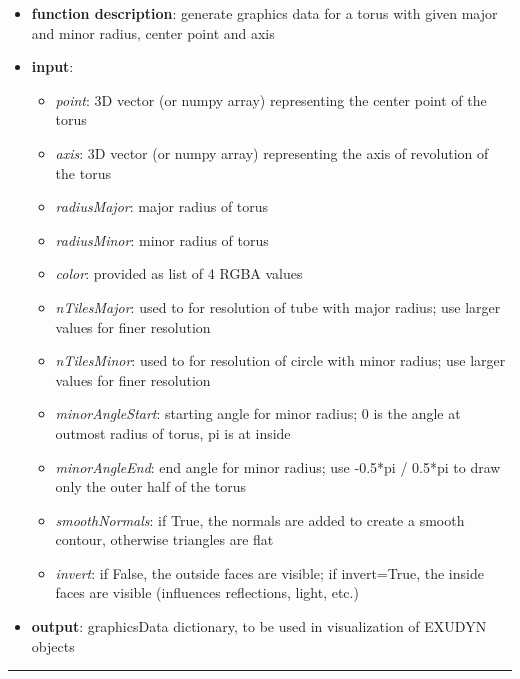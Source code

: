 \begin{itemize}[leftmargin=1.4cm]
\begin{itemize}[leftmargin=1.4cm]
\begin{itemize}[leftmargin=1.4cm]
\begin{itemize}[leftmargin=0.5cm]
\begin{itemize}[leftmargin=1.4cm]
\begin{itemize}[leftmargin=1.4cm]
\begin{itemize}[leftmargin=1.4cm]
\begin{itemize}[leftmargin=0.5cm]
\begin{itemize}[leftmargin=1.4cm]
\begin{itemize}[leftmargin=0.7cm]
\item[--]
{\bf function description}: generate graphics data for a torus with given major and minor radius, center point and axis
\item[--]
{\bf input}: \vspace{-6pt}
\begin{itemize}[leftmargin=1.2cm]
\setlength{\itemindent}{-0.7cm}
\item[]{\it point}: 3D vector (or numpy array) representing the center point of the torus
\item[]{\it axis}: 3D vector (or numpy array) representing the axis of revolution of the torus
\item[]{\it radiusMajor}: major radius of torus
\item[]{\it radiusMinor}: minor radius of torus
\item[]{\it color}: provided as list of 4 RGBA values
\item[]{\it nTilesMajor}: used to for resolution of tube with major radius; use larger values for finer resolution
\item[]{\it nTilesMinor}: used to for resolution of circle with minor radius; use larger values for finer resolution
\item[]{\it minorAngleStart}: starting angle for minor radius; 0 is the angle at outmost radius of torus, pi is at inside
\item[]{\it minorAngleEnd}: end angle for minor radius; use -0.5*pi / 0.5*pi to draw only the outer half of the torus
\item[]{\it smoothNormals}: if True, the normals are added to create a smooth contour, otherwise triangles are flat
\item[]{\it invert}: if False, the outside faces are visible; if invert=True, the inside faces are visible (influences reflections, light, etc.)
\end{itemize}
\item[--]
{\bf output}: graphicsData dictionary, to be used in visualization of EXUDYN objects
\vspace{12pt}\end{itemize}
%
\noindent\rule{8cm}{0.75pt}\vspace{1pt} \\ 
\begin{flushleft}
\label{sec:graphics:RigidLink}

\end{flushleft}
\end{itemize}
\end{itemize}
\end{itemize}
\end{itemize}
\end{itemize}
\end{itemize}
\end{itemize}
\end{itemize}
\end{itemize}
